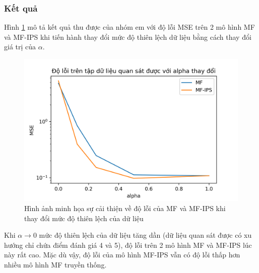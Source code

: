 \subsubsection{Kết quả}
Hình \ref{fig:4_movielens} mô tả kết quả thu được của nhóm em với độ lỗi MSE trên 2 mô hình MF và MF-IPS khi tiến hành thay đổi mức độ thiên lệch dữ liệu bằng cách thay đổi giá trị của $\alpha$.
\begin{figure}[h]
    \centering
    \includegraphics{images/Chapter4/change_alpha.png}
    \caption{Hình ảnh minh họa sự cải thiện về độ lỗi của MF và MF-IPS khi thay đổi mức độ thiên lệch của dữ liệu}
    \label{fig:4_movielens}
\end{figure}

Khi $\alpha \rightarrow 0$ mức độ thiên lệch của dữ liệu tăng dần (dữ liệu quan sát được có xu hướng chỉ chứa điểm đánh giá 4 và 5), độ lỗi trên 2 mô hình MF và MF-IPS lúc này rất cao. Mặc dù vậy, độ lỗi của mô hình MF-IPS vẫn có độ lỗi thấp hơn nhiều mô hình MF truyền thống. 

